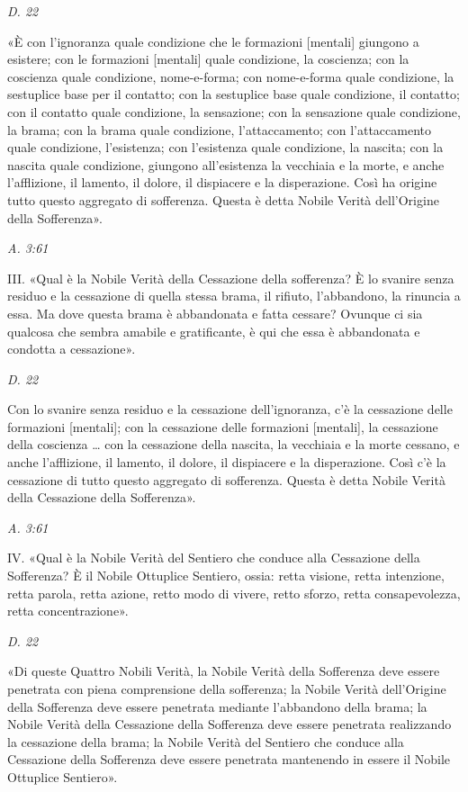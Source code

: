 \emph{D. 22}


«È con l’ignoranza quale condizione che le formazioni [mentali] giungono
a esistere; con le formazioni [mentali] quale condizione, la coscienza;
con la coscienza quale condizione, nome-e-forma; con nome-e-forma quale
condizione, la sestuplice base per il contatto; con la sestuplice base
quale condizione, il contatto; con il contatto quale condizione, la
sensazione; con la sensazione quale condizione, la brama; con la brama
quale condizione, l’attaccamento; con l’attaccamento quale condizione,
l’esistenza; con l’esistenza quale condizione, la nascita; con la
nascita quale condizione, giungono all’esistenza la vecchiaia e la
morte, e anche l’afflizione, il lamento, il dolore, il dispiacere e la
disperazione. Così ha origine tutto questo aggregato di sofferenza.
Questa è detta Nobile Verità dell’Origine della Sofferenza».


\emph{A. 3:61}


III. «Qual è la Nobile Verità della Cessazione della sofferenza? È lo
svanire senza residuo e la cessazione di quella stessa brama, il
rifiuto, l’abbandono, la rinuncia a essa. Ma dove questa brama è
abbandonata e fatta cessare? Ovunque ci sia qualcosa che sembra amabile
e gratificante, è qui che essa è abbandonata e condotta a cessazione».


\emph{D. 22}


Con lo svanire senza residuo e la cessazione dell’ignoranza, c’è la
cessazione delle formazioni [mentali]; con la cessazione delle
formazioni [mentali], la cessazione della coscienza … con la cessazione
della nascita, la vecchiaia e la morte cessano, e anche l’afflizione, il
lamento, il dolore, il dispiacere e la disperazione. Così c’è la
cessazione di tutto questo aggregato di sofferenza. Questa è detta
Nobile Verità della Cessazione della Sofferenza».


\emph{A. 3:61}


IV. «Qual è la Nobile Verità del Sentiero che conduce alla Cessazione
della Sofferenza? È il Nobile Ottuplice Sentiero, ossia: retta visione,
retta intenzione, retta parola, retta azione, retto modo di vivere,
retto sforzo, retta consapevolezza, retta concentrazione».


\emph{D. 22}


«Di queste Quattro Nobili Verità, la Nobile Verità della Sofferenza deve
essere penetrata con piena comprensione della sofferenza; la Nobile
Verità dell’Origine della Sofferenza deve essere penetrata mediante
l’abbandono della brama; la Nobile Verità della Cessazione della
Sofferenza deve essere penetrata realizzando la cessazione della brama;
la Nobile Verità del Sentiero che conduce alla Cessazione della
Sofferenza deve essere penetrata mantenendo in essere il Nobile
Ottuplice Sentiero».


